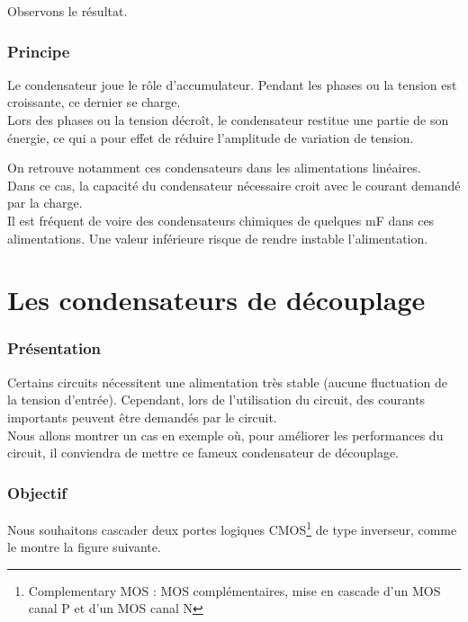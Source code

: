 Observons le résultat.


\subsubsection{Principe}

Le condensateur joue le rôle d'accumulateur. Pendant les phases ou la tension est croissante, ce dernier se charge. \\
Lors des phases ou la tension décroît, le condensateur restitue une partie de son énergie, ce qui a pour effet de réduire l'amplitude de variation de tension.\n 

On retrouve notamment ces condensateurs dans les alimentations linéaires. \\
Dans ce cas, la capacité du condensateur nécessaire croit avec le courant demandé par la charge. \\

Il est fréquent de voire des condensateurs chimiques de quelques mF dans ces alimentations. Une valeur inférieure risque de rendre instable l'alimentation.


\section{Les condensateurs de découplage}

\subsubsection{Présentation}


Certains circuits nécessitent une alimentation très stable (aucune fluctuation de la tension d'entrée). 
Cependant, lors de l'utilisation du circuit, des courants importants peuvent être demandés par le circuit. \\
Nous allons montrer un cas en exemple où, pour améliorer les performances du circuit, il conviendra 
de mettre ce fameux condensateur de découplage.

\subsubsection{Objectif}

Nous souhaitons cascader deux portes logiques CMOS\footnote{Complementary MOS : MOS complémentaires, mise en cascade d'un MOS canal P et d'un MOS canal N} de type inverseur, comme le montre la figure suivante.

